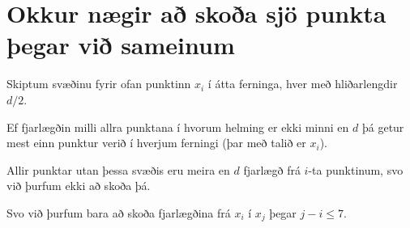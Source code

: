 \section{Okkur nægir að skoða sjö punkta þegar við sameinum}
{
    {
        \item<1-> Skiptum svæðinu fyrir ofan punktinn $x_i$ í átta ferninga, hver með hliðarlengdir $d/2$.
        \item<2-> Ef fjarlægðin milli allra punktana í hvorum helming er ekki minni en $d$ þá getur mest einn punktur verið í hverjum ferningi
                    (þar með talið er $x_i$).
        \item<3-> Allir punktar utan þessa svæðis eru meira en $d$ fjarlægð frá $i$-ta punktinum, svo við þurfum ekki að skoða þá.
        \item<4-> Svo við þurfum bara að skoða fjarlægðina frá $x_i$ í $x_j$ þegar $j - i \leq 7$.
    }
}

